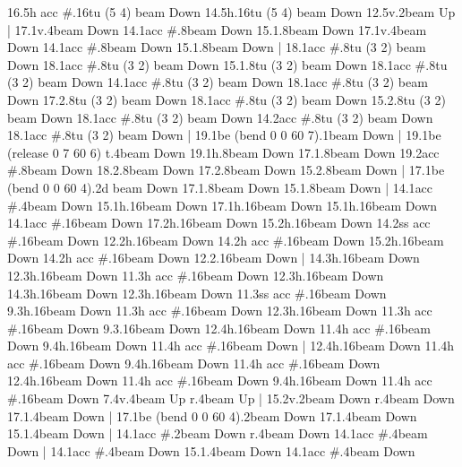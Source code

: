       16.5{h acc #}.16{tu (5 4) beam Down}
      14.5{h}.16{tu (5 4) beam Down}
      12.5{v}.2{beam Up}
    |
      17.1{v}.4{beam Down}
      14.1{acc #}.8{beam Down}
      15.1.8{beam Down}
      17.1{v}.4{beam Down}
      14.1{acc #}.8{beam Down}
      15.1.8{beam Down}
    |
      18.1{acc #}.8{tu (3 2) beam Down}
      18.1{acc #}.8{tu (3 2) beam Down}
      15.1.8{tu (3 2) beam Down}
      18.1{acc #}.8{tu (3 2) beam Down}
      14.1{acc #}.8{tu (3 2) beam Down}
      18.1{acc #}.8{tu (3 2) beam Down}
      17.2.8{tu (3 2) beam Down}
      18.1{acc #}.8{tu (3 2) beam Down}
      15.2.8{tu (3 2) beam Down}
      18.1{acc #}.8{tu (3 2) beam Down}
      14.2{acc #}.8{tu (3 2) beam Down}
      18.1{acc #}.8{tu (3 2) beam Down}
    |
      19.1{be (bend 0 0 60 7)}.1{beam Down}
    |
      19.1{be (release 0 7 60 6) t}.4{beam Down}
      19.1{h}.8{beam Down}
      17.1.8{beam Down}
      19.2{acc #}.8{beam Down}
      18.2.8{beam Down}
      17.2.8{beam Down}
      15.2.8{beam Down}
    |
      17.1{be (bend 0 0 60 4)}.2{d beam Down}
      17.1.8{beam Down}
      15.1.8{beam Down}
    |
      14.1{acc #}.4{beam Down}
      15.1{h}.16{beam Down}
      17.1{h}.16{beam Down}
      15.1{h}.16{beam Down}
      14.1{acc #}.16{beam Down}
      17.2{h}.16{beam Down}
      15.2{h}.16{beam Down}
      14.2{ss acc #}.16{beam Down}
      12.2{h}.16{beam Down}
      14.2{h acc #}.16{beam Down}
      15.2{h}.16{beam Down}
      14.2{h acc #}.16{beam Down}
      12.2.16{beam Down}
    |
      14.3{h}.16{beam Down}
      12.3{h}.16{beam Down}
      11.3{h acc #}.16{beam Down}
      12.3{h}.16{beam Down}
      14.3{h}.16{beam Down}
      12.3{h}.16{beam Down}
      11.3{ss acc #}.16{beam Down}
      9.3{h}.16{beam Down}
      11.3{h acc #}.16{beam Down}
      12.3{h}.16{beam Down}
      11.3{h acc #}.16{beam Down}
      9.3.16{beam Down}
      12.4{h}.16{beam Down}
      11.4{h acc #}.16{beam Down}
      9.4{h}.16{beam Down}
      11.4{h acc #}.16{beam Down}
    |
      12.4{h}.16{beam Down}
      11.4{h acc #}.16{beam Down}
      9.4{h}.16{beam Down}
      11.4{h acc #}.16{beam Down}
      12.4{h}.16{beam Down}
      11.4{h acc #}.16{beam Down}
      9.4{h}.16{beam Down}
      11.4{h acc #}.16{beam Down}
      7.4{v}.4{beam Up}
      r.4{beam Up}
    |
      15.2{v}.2{beam Down}
      r.4{beam Down}
      17.1.4{beam Down}
    |
      17.1{be (bend 0 0 60 4)}.2{beam Down}
      17.1.4{beam Down}
      15.1.4{beam Down}
    |
      14.1{acc #}.2{beam Down}
      r.4{beam Down}
      14.1{acc #}.4{beam Down}
    |
      14.1{acc #}.4{beam Down}
      15.1.4{beam Down}
      14.1{acc #}.4{beam Down}
